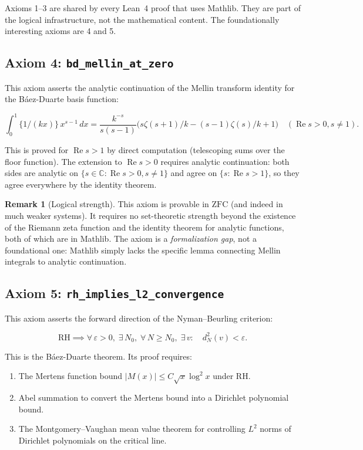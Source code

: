 \documentclass[11pt,a4paper]{article}
\theoremstyle{plain}
\theoremstyle{definition}
\newtheorem{remark}[theorem]{Remark}
\newcommand{\lean}[1]{\texttt{#1}}
\newcommand{\RH}{\ensuremath{\mathrm{RH}}}
\newcommand{\CC}{\mathbb{C}}
\newcommand{\ZFC}{\mathrm{ZFC}}
\newcommand{\re}{\operatorname{Re}}
\begin{document}
Axioms 1--3 are shared by every Lean~4 proof that uses Mathlib.
They are part of the logical infrastructure, not the mathematical
content. The foundationally interesting axioms are 4 and 5.

\subsection{Axiom 4: \lean{bd\_mellin\_at\_zero}}

This axiom asserts the analytic continuation of the Mellin transform
identity for the B\'aez-Duarte basis function:

\[
  \int_0^1 \{1/(kx)\}\,x^{s-1}\,dx = \frac{k^{-s}}{s(s-1)}
  \bigl(s\zeta(s+1)/k - (s-1)\zeta(s)/k + 1\bigr)
  \quad (\re s > 0, s \neq 1).
\]

This is proved for $\re s > 1$ by direct computation (telescoping
sums over the floor function). The extension to $\re s > 0$ requires
analytic continuation: both sides are analytic on $\{s \in \CC :
\re s > 0, s \neq 1\}$ and agree on $\{s : \re s > 1\}$, so they
agree everywhere by the identity theorem.

\begin{remark}[Logical strength]
This axiom is provable in $\ZFC$ (and indeed in much weaker systems).
It requires no set-theoretic strength beyond the existence of the
Riemann zeta function and the identity theorem for analytic functions,
both of which are in Mathlib. The axiom is a \emph{formalization gap},
not a foundational one: Mathlib simply lacks the specific lemma
connecting Mellin integrals to analytic continuation.
\end{remark}

\subsection{Axiom 5: \lean{rh\_implies\_l2\_convergence}}

This axiom asserts the forward direction of the Nyman--Beurling
criterion:

\[
  \RH \implies \forall\,\varepsilon > 0,\;\exists\,N_0,\;
  \forall\,N \geq N_0,\;\exists\,v :\quad d_N^2(v) < \varepsilon.
\]

This is the B\'aez-Duarte theorem. Its proof requires:

\begin{enumerate}
  \item The Mertens function bound $|M(x)| \leq C\sqrt{x}\log^2 x$
    under \RH.
  \item Abel summation to convert the Mertens bound into a
    Dirichlet polynomial bound.
  \item The Montgomery--Vaughan mean value theorem for controlling
    $L^2$ norms of Dirichlet polynomials on the critical line.
\end{enumerate}
\end{document}
